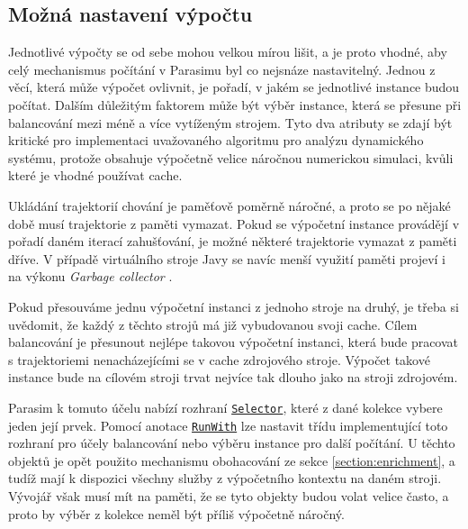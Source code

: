 \subsection{Možná nastavení výpočtu}

Jednotlivé výpočty se od sebe mohou velkou mírou lišit, a je proto vhodné, aby celý mechanismus
počítání v Parasimu byl co nejsnáze nastavitelný. Jednou z věcí, která může výpočet ovlivnit, je pořadí,
v jakém se jednotlivé instance budou počítat. Dalším důležitým faktorem může být výběr instance,
která se přesune při balancování mezi méně a více vytíženým strojem. Tyto dva atributy se zdají být
kritické pro implementaci uvažovaného algoritmu pro analýzu dynamického systému, protože obsahuje
výpočetně velice náročnou numerickou simulaci, kvůli které je vhodné používat cache.

Ukládání trajektorií chování je paměťově poměrně náročné, a proto se po nějaké době
musí trajektorie z paměti vymazat. Pokud se výpočetní instance pro\-vá\-dě\-jí v pořadí daném
iterací zahušťování, je možné některé trajektorie vymazat z paměti dříve. V případě virtuálního
stroje Javy se navíc menší využití paměti projeví i na výkonu \textit{Garbage collector} \cite{printezis2000}. 

Pokud přesouváme jednu výpočetní instanci z jednoho stroje na druhý, je třeba si uvědomit,
že každý z těchto strojů má již vybudovanou svoji cache. Cílem balancování je přesunout
nejlépe takovou výpočetní instanci, která bude pracovat s trajektoriemi nenacházejícími
se v cache zdrojového stroje. Výpočet takové instance bude na cílovém stroji trvat nejvíce tak dlouho jako
na stroji zdrojovém.

Parasim k tomuto účelu nabízí rozhraní \href{https://github.com/sybila/parasim/blob/2.0.0.Final/extensions/computation-lifecycle-api/src/main/java/org/sybila/parasim/computation/lifecycle/api/Selector.java}{\texttt{Selector}}, které z dané kolekce vybere jeden její prvek. Pomocí anotace \href{https://github.com/sybila/parasim/blob/2.0.0.Final/extensions/computation-lifecycle-api/src/main/java/org/sybila/parasim/computation/lifecycle/api/annotations/RunWith.java}{\texttt{RunWith}} lze nastavit třídu implementující toto rozhraní
pro účely balancování nebo výběru instance pro další počítání. U těchto objektů je opět použito mechanismu obohacování ze sekce \ref{section:enrichment},
a tudíž mají k dispozici všechny služby z výpočetního kontextu na daném stroji.
Vývojář však musí mít na paměti, že se tyto objekty budou volat velice často, 
a proto by výběr z kolekce neměl být příliš výpočetně náročný.


